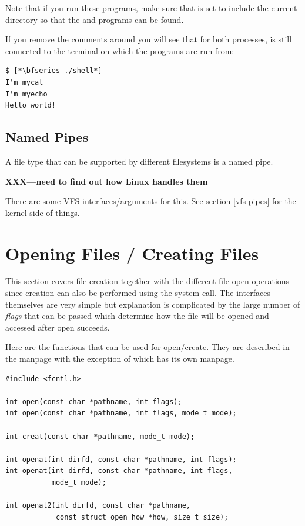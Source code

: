 \noindent
Note that if you run these programs, make sure that  is set to include the current directory so that the  and  programs can be found.

If you remove the comments around  you will see that for both processes,  is still connected to the terminal on which the programs are run from:

\begin{lstlisting}
$ [*\bfseries ./shell*]
I'm mycat
I'm myecho
Hello world!
\end{lstlisting}

\subsection{Named Pipes}

A file type that can be supported by different filesystems is a named pipe.

\textbf{XXX---need to find out how Linux handles them}

There are some VFS interfaces/arguments for this. See section \ref{vfs-pipes} for the kernel side of things.

\section{Opening Files / Creating Files}

This section covers file creation together with the different file open operations since creation can also be performed using the  system call. The interfaces themselves are very simple but explanation is complicated by the large number of \textit{flags} that can be passed which determine how the file will be opened and accessed after open succeeds.

Here are the functions that can be used for open/create. They are described in the  manpage with the exception of  which has its own manpage.

\begin{lstlisting}
#include <fcntl.h>

int open(const char *pathname, int flags);
int open(const char *pathname, int flags, mode_t mode);

int creat(const char *pathname, mode_t mode);

int openat(int dirfd, const char *pathname, int flags);
int openat(int dirfd, const char *pathname, int flags,
           mode_t mode);

int openat2(int dirfd, const char *pathname,
            const struct open_how *how, size_t size);
\end{lstlisting}

